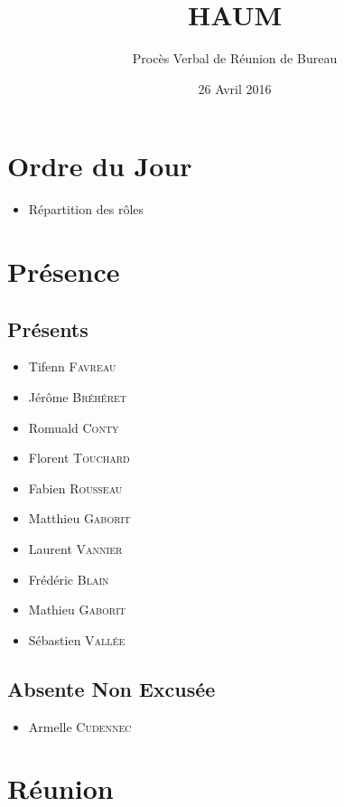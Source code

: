 \documentclass[a4paper, 11pt]{article}
\title{HAUM}
\author{Procès Verbal de Réunion de Bureau}
\date{26 Avril 2016}
\begin{document}
	\maketitle

	\section{Ordre du Jour}

	\begin{itemize}
		\item Répartition des rôles
	\end{itemize}

	\section{Présence}

	\subsection{Présents}

	\begin{itemize}
		\item Tifenn \textsc{Favreau}
		\item Jérôme \textsc{Bréhéret}
		\item Romuald \textsc{Conty}
		\item Florent \textsc{Touchard}
		\item Fabien \textsc{Rousseau}
		\item Matthieu \textsc{Gaborit}
		\item Laurent \textsc{Vannier}
		\item Frédéric \textsc{Blain}
		\item Mathieu \textsc{Gaborit}
		\item Sébastien \textsc{Vallée}
	\end{itemize}

	\subsection{Absente Non Excusée}

	\begin{itemize}
		\item Armelle \textsc{Cudennec}
	\end{itemize}

	\section{Réunion}
\end{document}

